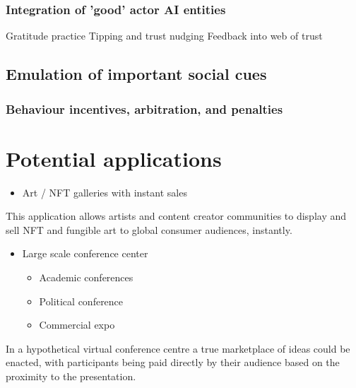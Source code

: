 \documentclass[
	12pt, %
	fleqn, %
	a4paper, %
	oneside, %
]{LegrandOrangeBook}
\begin{document}
\subsubsection{Integration of 'good' actor AI entities}
Gratitude practice
Tipping and trust nudging
Feedback into web of trust
\subsection{Emulation of important social cues}
\subsubsection{Behaviour incentives, arbitration, and penalties}

\section{Potential applications }
\begin{itemize}
\item Art / NFT galleries with instant sales
\end{itemize}

This application allows artists and content creator communities to
display and sell NFT and fungible art to global consumer audiences,
instantly.

\begin{itemize}
\item
  Large scale conference center

  \begin{itemize}
  \item
    Academic conferences
  \item
    Political conference
  \item
    Commercial expo
  \end{itemize}
\end{itemize}

In a hypothetical virtual conference centre a true marketplace of ideas
could be enacted, with participants being paid directly by their
audience based on the proximity to the presentation.
\end{document}
